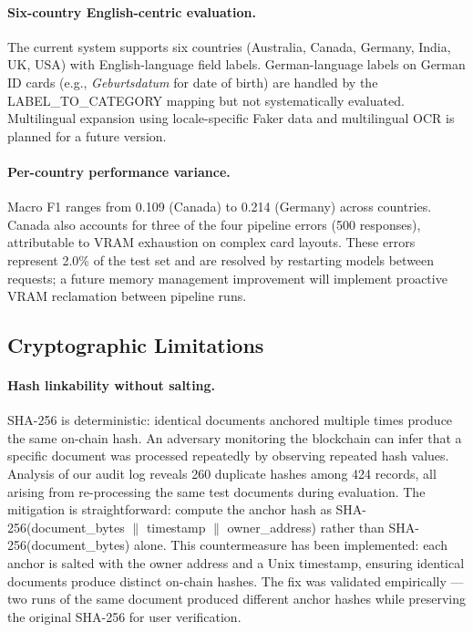 \paragraph{Six-country English-centric evaluation.}
The current system supports six countries
(Australia, Canada, Germany, India, UK, USA) with
English-language field labels.
German-language labels on German ID cards (e.g.,
\textit{Geburtsdatum} for date of birth) are
handled by the LABEL\_TO\_CATEGORY mapping but
not systematically evaluated.
Multilingual expansion using locale-specific Faker
data and multilingual OCR is planned for a future
version.
 
\paragraph{Per-country performance variance.}
Macro F1 ranges from 0.109 (Canada) to 0.214
(Germany) across countries.
Canada also accounts for three of the four pipeline
errors (500 responses), attributable to VRAM exhaustion
on complex card layouts.
These errors represent 2.0\% of the test set and
are resolved by restarting models between requests;
a future memory management improvement will implement
proactive VRAM reclamation between pipeline runs.
 
\subsection{Cryptographic Limitations}
 
\paragraph{Hash linkability without salting.}
SHA-256 is deterministic: identical documents
anchored multiple times produce the same on-chain
hash.
An adversary monitoring the blockchain can infer that
a specific document was processed repeatedly by
observing repeated hash values.
Analysis of our audit log reveals 260 duplicate hashes
among 424 records, all arising from re-processing the
same test documents during evaluation.
The mitigation is straightforward: compute the
anchor hash as SHA-256(document\_bytes $\|$ timestamp
$\|$ owner\_address) rather than SHA-256(document\_bytes)
alone.
This countermeasure has been implemented: each anchor
is salted with the owner address and a Unix timestamp,
ensuring identical documents produce distinct on-chain
hashes. The fix was validated empirically --- two runs
of the same document produced different anchor hashes
while preserving the original SHA-256 for user verification.
 
